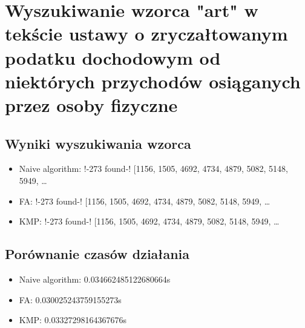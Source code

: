 \documentclass{article}
\begin{document}
\section{Wyszukiwanie wzorca "art" w tekście ustawy o zryczałtowanym podatku dochodowym od niektórych przychodów osiąganych przez osoby fizyczne}
	\subsection{Wyniki wyszukiwania wzorca}
		\begin{itemize}
		\item Naive algorithm: !-273 found-! [1156, 1505, 4692, 4734, 4879, 5082, 5148, 5949, …
		\item FA: !-273 found-! [1156, 1505, 4692, 4734, 4879, 5082, 5148, 5949, …
		\item KMP: !-273 found-! [1156, 1505, 4692, 4734, 4879, 5082, 5148, 5949, …
		\end{itemize}
	\subsection{Porównanie czasów działania}
		\begin{itemize}
		\item Naive algorithm: 0.034662485122680664s
		\item FA: 0.030025243759155273s
		\item KMP: 0.03327298164367676s
		\end{itemize}
\end{document}
